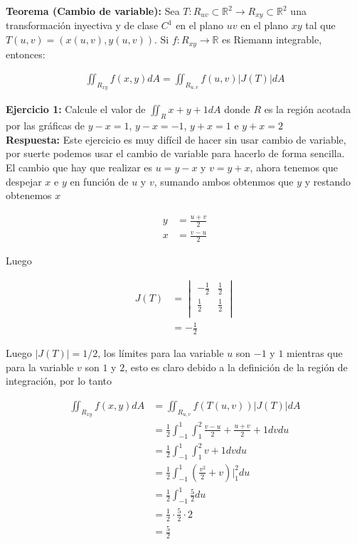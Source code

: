 \documentclass{article}
\theoremstyle{definition}
\begin{document}
\textbf{Teorema (Cambio de variable):} Sea $T : R_{uv} \subset \mathbb{R}^2 \to R_{xy}\subset \mathbb{R}^2$ una transformaci\'on inyectiva y de clase $C^1$ en el plano $uv$ en el plano $xy$ tal que $T (u, v ) = (x (u, v ) , y (u, v ))$. Si $f : R_{xy} \to \mathbb{R}$ es Riemann integrable, entonces:

\begin{align*}
    \iint_{R_{xy}} f(x,y)dA =  \iint_{R_{u,v}} f(u,v) |J(T)|dA
\end{align*}

\newpage

\textbf{Ejercicio 1:} Calcule el valor de $\iint_{R} x+y+1dA$ donde $R$ es la regi\'on acotada por las gr\'aficas de $y-x=1$, $y-x=-1$, $y+x=1$ e $y+x=2$ \\

\textbf{Respuesta:} Este ejercicio es muy dif\'icil de hacer sin usar cambio de variable, por suerte podemos usar el cambio de variable para hacerlo de forma sencilla. \\

El cambio que hay que realizar es $u=y-x$ y $v=y+x$, ahora tenemos que despejar $x$ e $y$ en funci\'on de $u$ y $v$, sumando ambos obtenmos que $y$ y restando obtenemos $x$

\begin{align*}
    y &= \frac{u+v}{2} \\
    x &= \frac{v-u}{2}
\end{align*}

Luego


\begin{align*}
    J(T) &=\begin{vmatrix}
        -\frac{1}{2} & \frac{1}{2} \\
        \frac{1}{2} & \frac{1}{2} \\
    \end{vmatrix} \\
    &= -\frac{1}{2}
\end{align*}

Luego $|J(T)| =1/2$, los l\'imites para laa variable $u$ son $-1$ y $1$ mientras que para la variable $v$ son $1$ y $2$, esto es claro debido a la definici\'on de la regi\'on de integraci\'on, por lo tanto




\begin{align*}
    \iint_{R_{xy}} f(x,y)dA &=  \iint_{R_{u,v}} f(T(u,v)) |J(T)|dA \\
    &=  \frac{1}{2}\int_{-1}^1\int_1^2  \frac{v-u}{2} +\frac{u+v}{2} +1 dvdu \\
    &=  \frac{1}{2}\int_{-1}^1\int_1^2  v +1 dvdu \\
    &= \frac{1}{2} \int_{-1}^1\left( \frac{v^2}{2}+v\right)\bigg|_1^2 du \\
    &= \frac{1}{2} \int_{-1}^1 \frac{5}{2}du \\
    &= \frac{1}{2} \cdot \frac{5}{2} \cdot 2 \\
    &= \frac{5}{2}
\end{align*}
\end{document}
